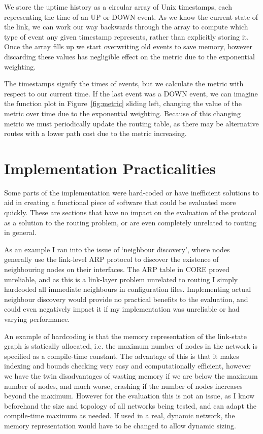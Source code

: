 \documentclass[withindex,glossary,openany]{cam-thesis}
\begin{document}
We store the uptime history as a circular array of Unix timestamps, each representing the time of an UP or DOWN event. As we know the current state of the link, we can work our way backwards through the array to compute which type of event any given timestamp represents, rather than explicitly storing it. Once the array fills up we start overwriting old events to save memory, however discarding these values has negligible effect on the metric due to the exponential weighting.

The timestamps signify the times of events, but we calculate the metric with respect to our current time. If the last event was a DOWN event, we can imagine the function plot in Figure~\ref{fig:metric} sliding left, changing the value of the metric over time due to the exponential weighting. Because of this changing metric we must periodically update the routing table, as there may be alternative routes with a lower path cost due to the metric increasing.

\section{Implementation Practicalities}

Some parts of the implementation were hard-coded or have inefficient solutions to aid in creating a functional piece of software that could be evaluated more quickly. These are sections that have no impact on the evaluation of the protocol as a solution to the routing problem, or are even completely unrelated to routing in general.

As an example I ran into the issue of `neighbour discovery', where nodes generally use the link-level ARP protocol to discover the existence of neighbouring nodes on their interfaces. The ARP table in CORE proved unreliable, and as this is a link-layer problem unrelated to routing I simply hardcoded all immediate neighbours in configuration files. Implementing actual neighbour discovery would provide no practical benefits to the evaluation, and could even negatively impact it if my implementation was unreliable or had varying performance.

An example of hardcoding is that the memory representation of the link-state graph is statically allocated, i.e. the maximum number of nodes in the network is specified as a compile-time constant. The advantage of this is that it makes indexing and bounds checking very easy and computationally efficient, however we have the twin disadvantages of wasting memory if we are below the maximum number of nodes, and much worse, crashing if the number of nodes increases beyond the maximum. However for the evaluation this is not an issue, as I know beforehand the size and topology of all networks being tested, and can adapt the compile-time maximum as needed. If used in a real, dynamic network, the memory representation would have to be changed to allow dynamic sizing.
\end{document}
